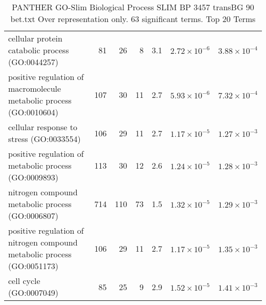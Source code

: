 \begin{table}[ht]
\begin{adjustbox}{width=\textwidth}
\begin{tabular}{lrrrrrr}
  cellular protein catabolic process (GO:0044257) & 81 & 26 & 8 & 3.1 & $2.72 \times 10^{-6}$ & $3.88 \times 10^{-4}$ \\ 
  positive regulation of macromolecule metabolic process (GO:0010604) & 107 & 30 & 11 & 2.7 & $5.93 \times 10^{-6}$ & $7.32 \times 10^{-4}$ \\ 
  cellular response to stress (GO:0033554) & 106 & 29 & 11 & 2.7 & $1.17 \times 10^{-5}$ & $1.27 \times 10^{-3}$ \\ 
  positive regulation of metabolic process (GO:0009893) & 113 & 30 & 12 & 2.6 & $1.24 \times 10^{-5}$ & $1.28 \times 10^{-3}$ \\ 
  nitrogen compound metabolic process (GO:0006807) & 714 & 110 & 73 & 1.5 & $1.32 \times 10^{-5}$ & $1.29 \times 10^{-3}$ \\ 
  positive regulation of nitrogen compound metabolic process (GO:0051173) & 106 & 29 & 11 & 2.7 & $1.17 \times 10^{-5}$ & $1.35 \times 10^{-3}$ \\ 
  cell cycle (GO:0007049) & 85 & 25 & 9 & 2.9 & $1.52 \times 10^{-5}$ & $1.41 \times 10^{-3}$ \\ 
   \hline
\end{tabular}
\end{adjustbox}
\caption{PANTHER GO-Slim Biological Process SLIM BP 3457 transBG 90 bet.txt Over representation only. 63 significant terms. Top 20 Terms} 
\label{tab:PANTHER GO-Slim Biological Process SLIM BP 3457 transBG 90 bet.txt Over representation only. 63 significant terms. Top 20 Terms}
\end{table}



